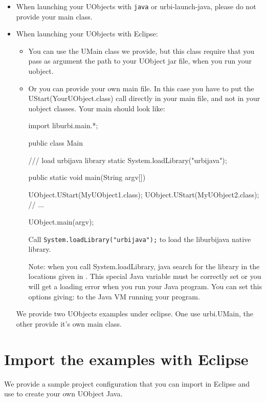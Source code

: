 \begin{itemize}

\item When launching your UObjects with \lstinline{java} or
  urbi-launch-java, please do not provide your main class.

\item When launching your UObjects with Eclipse:
\begin{itemize}
\item You can use the UMain class we provide, but this class require that
  you pass as argument the path to your UObject jar file, when you run your
  uobject.
\item Or you can provide your own main file. In this case you have to put
  the UStart(YourUObject.class) call directly in your main file, and not in
  your uobject classes. Your main should look like:

\begin{java}
import liburbi.main.*;

public class Main
{
  /// load urbijava library
  static
  {
    System.loadLibrary("urbijava");
  }

  public static void main(String argv[])
  {
    UObject.UStart(MyUObject1.class);
    UObject.UStart(MyUObject2.class);
    // ...

    UObject.main(argv);
  }
}
\end{java}

Call \lstinline{System.loadLibrary("urbijava");} to load the liburbijava
native library.

Note: when you call System.loadLibrary, java search for the library in the
locations given in . This special Java variable must
be correctly set or you will get a loading error when you run your Java
program.  You can set this options giving:
 to the
Java VM running your program.


\end{itemize}

We provide two UObjects examples under eclipse. One use urbi.UMain, the
other provide it's own main class.
\end{itemize}


\section{Import the examples with Eclipse}

We provide a sample 
project configuration that you can import in Eclipse and use to create your
own UObject Java.

